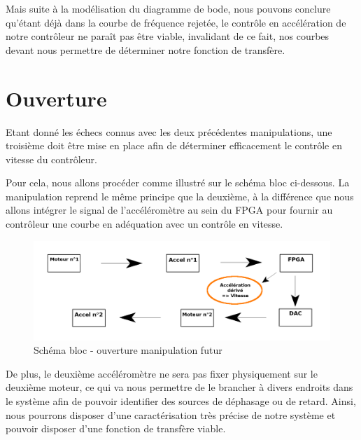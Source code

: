 \documentclass[french,a4paper,12pt]{report}
\begin{document}
			Mais suite à la modélisation du diagramme de bode, nous pouvons conclure qu'étant déjà dans la courbe de fréquence rejetée, le contrôle en accélération de notre contrôleur ne paraît pas être viable, invalidant de ce fait, nos courbes devant nous permettre de déterminer notre fonction de transfère.
			
\newpage
			
		\chapter{Ouverture}
	
		Etant donné les échecs connus avec les deux précédentes manipulations, une troisième doit être mise en place afin de déterminer efficacement le contrôle en vitesse du contrôleur.
		
		Pour cela, nous allons procéder comme illustré sur le schéma bloc ci-dessous. La manipulation reprend le même principe que la deuxième, à la différence que nous allons intégrer le signal de l'accéléromètre au sein du FPGA pour fournir au contrôleur une courbe en adéquation avec un contrôle en vitesse.
		
	\begin{figure}[!ht]
    \center
  	\includegraphics[width=18cm]{manip3.png}
    \caption{Schéma bloc - ouverture manipulation futur}
	\end{figure}
	
	De  plus, le deuxième accéléromètre ne sera pas fixer physiquement sur le deuxième moteur, ce qui va nous permettre de le brancher à divers endroits dans le système afin de pouvoir identifier des sources de déphasage ou de retard. Ainsi, nous pourrons disposer d'une caractérisation très précise de notre système et pouvoir disposer d'une fonction de transfère viable.
	
	
	
%
%
\end{document}
